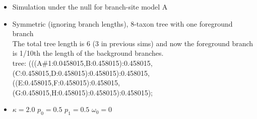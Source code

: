 \documentclass[12pt,letterpaper]{article}\usepackage[]{graphicx}\usepackage[]{color}
\begin{document}
\begin{itemize}
\item Simulation under the null for branch-site model A
\item Symmetric (ignoring branch lengths), 8-taxon tree with one foreground branch \\
  The total tree length is 6 (3 in previous sims) and now the foreground branch is 1/10th the length of the background branches.\\
  tree: (((A\#1:0.0458015,B:0.458015):0.458015,(C:0.458015,D:0.458015):0.458015):0.458015,\\((E:0.458015,F:0.458015):0.458015,(G:0.458015,H:0.458015):0.458015):0.458015);
\item $\kappa=2.0$ $p_0=0.5$ $p_1=0.5$ $\omega_0=0$
\end{itemize}
\end{document}
